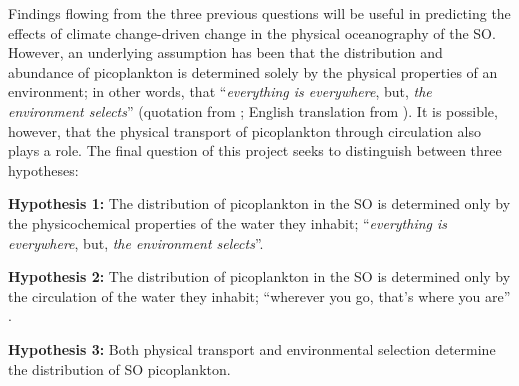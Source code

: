 Findings flowing from the three previous questions will be useful in predicting the effects of climate change-driven change in the physical oceanography of the \ac{SO}.
However, an underlying assumption has been that the distribution and abundance of picoplankton is determined solely by the physical properties of an environment; in other words, that ``\emph{everything is everywhere}, but, \emph{the environment selects}'' (quotation from \citet{Becking:1934um}; English translation from \citet{deWit:2006de}).
It is possible, however, that the physical transport of picoplankton through circulation also plays a role.
The final question of this project seeks to distinguish between three hypotheses:

\textbf{Hypothesis 1:} The distribution of picoplankton in the \ac{SO} is determined only by the physicochemical properties of the water they inhabit; ``\emph{everything is everywhere}, but, \emph{the environment selects}''.

\textbf{Hypothesis 2:} The distribution of picoplankton in the \ac{SO} is determined only by the circulation of the water they inhabit; ``wherever you go, that's where you are'' \cite{Bissett:2010wj}.

\textbf{Hypothesis 3:} Both physical transport and environmental selection determine the distribution of \ac{SO} picoplankton.
